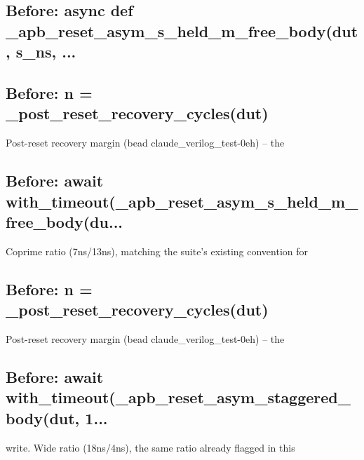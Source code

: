 \begin{record}

\subsection*{Before: async def \_apb\_reset\_asym\_s\_held\_m\_free\_body(dut, s\_ns, ...}


\subsection*{Before: n = \_post\_reset\_recovery\_cycles(dut)}

\begin{textblock}
Post-reset recovery margin (bead claude_verilog_test-0eh) -- the
\end{textblock}

\subsection*{Before: await with\_timeout(\_apb\_reset\_asym\_s\_held\_m\_free\_body(du...}

\begin{textblock}
Coprime ratio (7ns/13ns), matching the suite's existing convention for
\end{textblock}

\subsection*{Before: n = \_post\_reset\_recovery\_cycles(dut)}

\begin{textblock}
Post-reset recovery margin (bead claude_verilog_test-0eh) -- the
\end{textblock}

\subsection*{Before: await with\_timeout(\_apb\_reset\_asym\_staggered\_body(dut, 1...}

\begin{textblock}
write. Wide ratio (18ns/4ns), the same ratio already flagged in this
\end{textblock}

\end{record}

